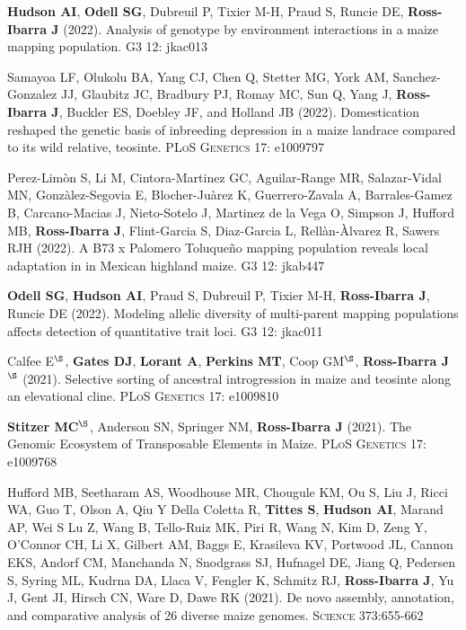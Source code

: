 \documentclass[letterpaper,10pt]{article}
\begin{document}
\begin{etaremune}
\item \textbf{Hudson AI}, \textbf{Odell SG}, Dubreuil P, Tixier M-H, Praud S, Runcie DE, \textbf{Ross-Ibarra J} (2022).  Analysis of genotype by environment interactions in a maize mapping population. \textsc{G3} 12: jkac013 %

\item  Samayoa LF, Olukolu  BA, Yang CJ, Chen Q, Stetter MG, York AM, Sanchez-Gonzalez JJ,  Glaubitz JC, Bradbury PJ,  Romay MC, Sun Q, Yang J, \textbf{Ross-Ibarra J}, Buckler ES, Doebley JF, and Holland JB (2022).   Domestication reshaped the genetic basis of inbreeding depression in a maize landrace compared to its wild relative, teosinte. \textsc{PLoS Genetics} 17: e1009797 %

\item Perez-Lim\`{o}n S, Li M, Cintora-Martinez GC, Aguilar-Range MR, Salazar-Vidal MN, Gonz\`{a}lez-Segovia E, Blocher-Ju\`{a}rez K, Guerrero-Zavala A, Barrales-Gamez B, Carcano-Macias J,  Nieto-Sotelo J, Martinez de la Vega O, Simpson J, Hufford MB, \textbf{Ross-Ibarra J}, Flint-Garcia S, Diaz-Garcia L, Rell\`{a}n-\`{A}lvarez R, Sawers RJH (2022). A B73 x Palomero Toluque\~{n}o mapping population reveals local adaptation in in Mexican highland maize. \textsc{G3} 12: jkab447 %

\item \textbf{Odell SG}, \textbf{Hudson AI}, Praud S, Dubreuil P, Tixier M-H, \textbf{Ross-Ibarra J}, Runcie DE (2022). Modeling allelic diversity of multi-parent mapping populations affects detection of quantitative trait loci. \textsc{G3} 12: jkac011 %

\item Calfee E$^\S$, \textbf{Gates DJ}, \textbf{Lorant A}, \textbf{Perkins MT}, Coop GM$^\S$, \textbf{Ross-Ibarra J}$^\S$ (2021). Selective sorting of ancestral introgression in maize and teosinte along an elevational cline. \textsc{PLoS Genetics} 17: e1009810

\item \textbf{Stitzer MC}$^\S$, Anderson SN, Springer NM, \textbf{Ross-Ibarra J} (2021). The Genomic Ecosystem of Transposable Elements in Maize. \textsc{PLoS Genetics} 17: e1009768

\item Hufford MB, Seetharam AS, Woodhouse MR, Chougule KM, Ou S, Liu J, Ricci WA, Guo T, Olson A, Qiu Y Della Coletta R, \textbf{Tittes S}, \textbf{Hudson AI},  Marand AP, Wei S Lu Z, Wang B, Tello-Ruiz MK, Piri R, Wang N, Kim D, Zeng Y, O'Connor CH, Li X, Gilbert AM, Baggs E, Krasileva KV, Portwood JL, Cannon EKS, Andorf CM, Manchanda N, Snodgrass SJ, Hufnagel DE, Jiang Q, Pedersen S, Syring ML, Kudrna DA, Llaca V, Fengler K, Schmitz RJ, \textbf{Ross-Ibarra J}, Yu J, Gent JI, Hirsch CN, Ware D, Dawe RK (2021). De novo assembly, annotation, and comparative analysis of 26 diverse maize genomes. \textsc{Science} 373:655-662


\end{etaremune}
\end{document}
